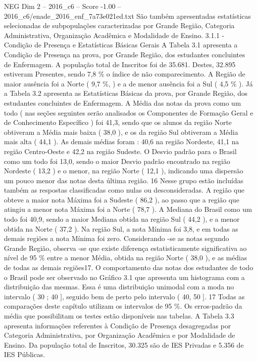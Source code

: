 \begin{textsample}{NEG Dim 2 – 2016\_c6 – Score -1.00 – 2016\_c6/enade\_2016\_enf\_7a73e021ed.txt}
São também apresentadas estatísticas selecionadas de subpopulações caracterizadas por Grande Região, Categoria Administrativa, Organização Acadêmica e Modalidade de Ensino. 3.1.1 - Condição de Presença e Estatísticas Básicas Gerais A Tabela 3.1 apresenta a Condição de Presença na prova, por Grande Região, dos estudantes concluintes de Enfermagem.
A população total de Inscritos foi de 35.681.
Destes, 32.895 estiveram Presentes, sendo 7,8 \% o índice de não comparecimento.
A Região de maior ausência foi a Norte ( 9,7 \%, ) e a de menor ausência foi a Sul ( 4,5 \% ).
Já a Tabela 3.2 apresenta as Estatísticas Básicas da prova, por Grande Região, dos estudantes concluintes de Enfermagem.
A Média das notas da prova como um todo ( nas seções seguintes serão analisados os Componentes de Formação Geral e de Conhecimento Específico ) foi 41,3, sendo que os alunos da região Norte obtiveram a Média mais baixa ( 38,0 ), e os da região Sul obtiveram a Média mais alta ( 44,1 ).
As demais médias foram : 40,6 na região Nordeste, 41,1 na região Centro-Oeste e 42,2 na região Sudeste.
O Desvio padrão para o Brasil como um todo foi 13,0, sendo o maior Desvio padrão encontrado na região Nordeste ( 13,2 ) e o menor, na região Norte ( 12,1 ), indicando uma dispersão um pouco menor das notas desta última região. 16 Nesse grupo estão incluídas também as respostas classificadas como nulas ou desconsideradas.
A região que obteve a maior nota Máxima foi a Sudeste ( 86,2 ), ao passo que a região que atingiu a menor nota Máxima foi a Norte ( 78,7 ).
A Mediana do Brasil como um todo foi 40,9, sendo a maior Mediana obtida na região Sul ( 44,2 ), e a menor obtida na Norte ( 37,2 ).
Na região Sul, a nota Mínima foi 3,8, e em todas as demais regiões a nota Mínima foi zero.
Considerando -se as notas segundo Grande Região, observa -se que existe diferença estatisticamente significativa ao nível de 95 \% entre a menor Média, obtida na região Norte ( 38,0 ), e as médias de todas as demais regiões17.
O comportamento das notas dos estudantes de todo o Brasil pode ser observado no Gráfico 3.1 que apresenta um histograma com a distribuição das mesmas.
Essa é uma distribuição unimodal com a moda no intervalo ( 30 ; 40 ], seguido bem de perto pelo intervalo ( 40, 50 ]. 17 Todas as comparações deste capítulo utilizam os intervalos de 95 \%.
Os erros-padrão da média que possibilitam os testes estão disponíveis nas tabelas.
A Tabela 3.3 apresenta informações referentes à Condição de Presença desagregadas por Categoria Administrativa, por Organização Acadêmica e por Modalidade de Ensino.
Da população total de Inscritos, 30.325 são de IES Privadas e 5.356 de IES Públicas.

\end{textsample}
